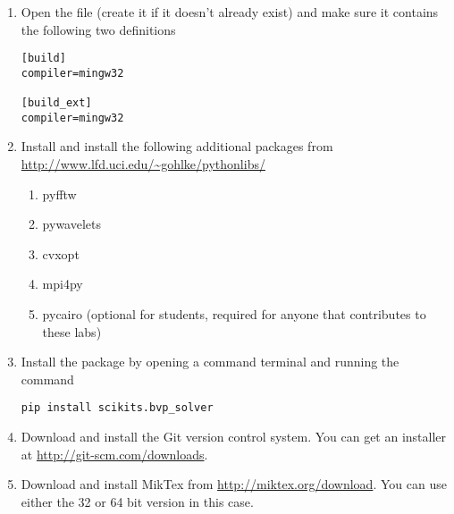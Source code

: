 \begin{enumerate}
\item Open the file  (create it if it doesn't already exist) and make sure it contains the following two definitions
\begin{lstlisting}
[build]
compiler=mingw32

[build_ext]
compiler=mingw32
\end{lstlisting}

\item Install and install the following additional packages from \url{http://www.lfd.uci.edu/~gohlke/pythonlibs/}
\begin{enumerate}
	\item pyfftw
	\item pywavelets
	\item cvxopt
	\item mpi4py
	\item pycairo (optional for students, required for anyone that contributes to these labs)
\end{enumerate}

\item Install the  package by opening a command terminal and running the command
\begin{lstlisting}[style=ShellInput]
pip install scikits.bvp_solver
\end{lstlisting}

\item Download and install the Git version control system.
You can get an installer at \url{http://git-scm.com/downloads}.

\item Download and install MikTex from \url{http://miktex.org/download}.
You can use either the 32 or 64 bit version in this case.

\end{enumerate}

